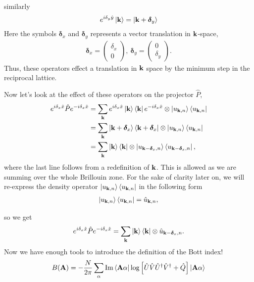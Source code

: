similarly
\begin{align}
	e^{i \delta_y \hat y}\ket{\bf k} = \ket{\bf k + \boldsymbol \delta_y } 
\end{align}
Here the symbols $\boldsymbol{\delta}_x$ and $\boldsymbol{\delta}_y$ represents a vector translation in $\bf k$-space,
\begin{align}
	\boldsymbol \delta_x = \begin{pmatrix}
	\delta_x \\
	0
	\end{pmatrix}, \ \boldsymbol \delta_y = \begin{pmatrix}
	0 \\
	\delta_y
	\end{pmatrix}.
\end{align}
Thus, these operators effect a translation in $\bf k$ space by the minimum step in the reciprocal lattice. \par
Now let's look at the effect of these operators on the projector $\hat P$,
\begin{align}
	e^{i \delta_x \hat x} \hat P e^{-i \delta_x \hat x}  &=  \sum_{\bf k} e^{i \delta_x \hat x}  \ket{\bf k} \bra{\bf k} e^{-i \delta_x \hat x}\otimes \ket{u_{\bf k, n}}\bra{u_{\bf k, n}} \\
	&=  \sum_{\bf k} \ket{\bf k +\boldsymbol{\delta}_x} \bra{\bf k +\boldsymbol{\delta}_x } \otimes \ket{u_{\bf k, n}}\bra{u_{\bf k, n}} \\
	&=  \sum_{\bf k} \ket{\bf k } \bra{\bf k } \otimes \ket{u_{\bf k-\boldsymbol{\delta}_x, n}}\bra{u_{\bf k-\boldsymbol{\delta}_x , n}},
\end{align}
where the last line follows from a redefinition of $\bf k$. This is allowed as we are summing over the whole Brillouin zone. For the sake of clarity later on, we will re-express the density operator $\ket{u_{\bf k, n}}\bra{u_{\bf k, n}}$ in the following form
\begin{align}
	\ket{u_{\bf k, n}}\bra{u_{\bf k, n}} = \hat u_{\bf k, n},
\end{align}\par
so we get
\begin{align} \label{eqn:p_identity}
	e^{i \delta_x \hat x} \hat P e^{-i \delta_x \hat x}  =  \sum_{\bf k} \ket{\bf k } \bra{\bf k } \otimes \hat u_{\bf k-\boldsymbol{\delta}_x, n}.
\end{align}
Now we have enough tools to introduce the definition of the Bott index!
\begin{align}\label{eqn:bott_index}
    B(\bf A) = -\frac{N}{2\pi} \sum_\alpha \Im \bra{\bf A \alpha} \log \left [ \hat U\hat V\hat U^\dag \hat V^\dag + \hat Q \right ]\ket{ \bf A \alpha}
\end{align}
